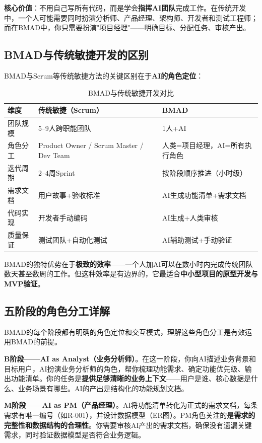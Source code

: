 \textbf{核心价值}：不用自己写所有代码，而是学会\textbf{指挥AI团队}完成工作。在传统开发中，一个人可能需要同时扮演分析师、产品经理、架构师、开发者和测试工程师；而在BMAD中，你只需要扮演"项目经理"——明确目标、分配任务、审核产出。

\subsection{BMAD与传统敏捷开发的区别}

BMAD与Scrum等传统敏捷方法的关键区别在于\textbf{AI的角色定位}：

\begin{table}[H]
\centering
\small
\begin{tabular}{lp{5cm}p{5cm}}
\toprule
\textbf{维度} & \textbf{传统敏捷（Scrum）} & \textbf{BMAD} \\
\midrule
团队规模 & 5--9人跨职能团队 & 1人+AI \\
角色分工 & Product Owner / Scrum Master / Dev Team & 人类=项目经理，AI=所有执行角色 \\
迭代周期 & 2--4周Sprint & 按阶段顺序推进（小时级） \\
需求文档 & 用户故事+验收标准 & AI生成功能清单+需求文档 \\
代码实现 & 开发者手动编码 & AI生成+人类审核 \\
质量保证 & 测试团队+自动化测试 & AI辅助测试+手动验证 \\
\bottomrule
\end{tabular}
\caption{BMAD与传统敏捷开发对比}
\end{table}

BMAD的独特优势在于\textbf{极致的效率}——一个人加AI可以在数小时内完成传统团队数天甚至数周的工作。但这种效率是有边界的，它最适合\textbf{中小型项目的原型开发与MVP验证}。

\subsection{五阶段的角色分工详解}

BMAD的每个阶段都有明确的角色定位和交互模式，理解这些角色分工是有效运用BMAD的前提。

\textbf{B阶段——AI as Analyst（业务分析师）}。在这一阶段，你向AI描述业务背景和目标用户，AI扮演业务分析师的角色，帮你梳理功能需求、确定功能优先级、输出功能清单。你的任务是\textbf{提供足够清晰的业务上下文}——用户是谁、核心数据是什么、业务场景有哪些。AI的产出是结构化的功能规划文档。

\textbf{M阶段——AI as PM（产品经理）}。AI将功能清单转化为正式的需求文档，每条需求有唯一编号（如R-001），并设计数据模型（ER图）。PM角色关注的是\textbf{需求的完整性和数据结构的合理性}。你需要审核AI产出的需求文档，确保没有遗漏关键需求，同时验证数据模型是否符合业务逻辑。


